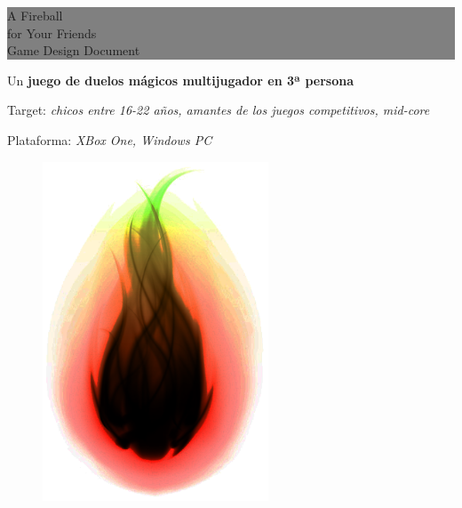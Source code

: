 \documentclass[12pt]{report}
\begin{document}
\pagestyle{empty} %


\colorbox{grey}{
	\parbox[t]{1.0\linewidth}{
		\fontsize{50pt}{30pt}\selectfont %
		\vspace*{0.7cm} %
		
		A Fireball \\ 
		for Your Friends \\ 
        \fontsize{30pt}{34pt}\selectfont
        Game Design Document		
		\par
		
		\vspace*{0.4cm} %
	}
}

\vspace*{0.4cm} 
{\large Un \textbf{juego de duelos mágicos multijugador en 3ª persona}}

\begin{spacing}{0.6}
Target: \textit{chicos entre 16-22 años, amantes de los juegos competitivos, mid-core} 

Plataforma: \textit{XBox One, Windows PC}
\end{spacing}


\begin{figure}[h]
    \centering
    \includegraphics[width=0.6\textwidth]{fireball}
\end{figure}
\end{document}
